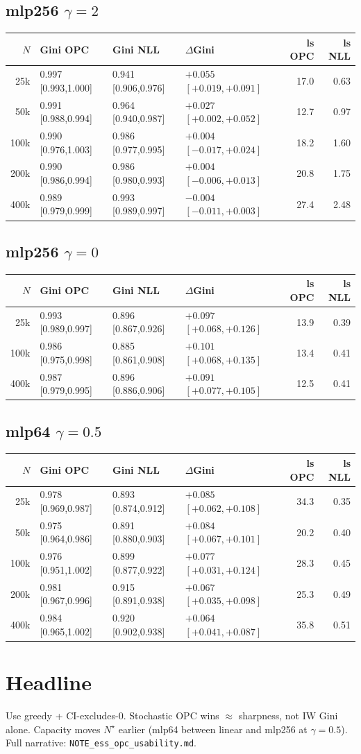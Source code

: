 \documentclass[10pt]{article}
\begin{document}
\subsection*{mlp256 $\gamma{=}2$}
{\scriptsize
\begin{tabular}{@{}r ll l rr@{}}
\toprule
$N$ & Gini OPC & Gini NLL & $\Delta$Gini & ls OPC & ls NLL \\
\midrule
25k & 0.997 [0.993,1.000] & 0.941 [0.906,0.976] & $+0.055$ $[+0.019,+0.091]$ & 17.0 & 0.63 \\
50k & 0.991 [0.988,0.994] & 0.964 [0.940,0.987] & $+0.027$ $[+0.002,+0.052]$ & 12.7 & 0.97 \\
100k & 0.990 [0.976,1.003] & 0.986 [0.977,0.995] & $+0.004$ $[-0.017,+0.024]$ & 18.2 & 1.60 \\
200k & 0.990 [0.986,0.994] & 0.986 [0.980,0.993] & $+0.004$ $[-0.006,+0.013]$ & 20.8 & 1.75 \\
400k & 0.989 [0.979,0.999] & 0.993 [0.989,0.997] & $-0.004$ $[-0.011,+0.003]$ & 27.4 & 2.48 \\
\bottomrule
\end{tabular}}

\subsection*{mlp256 $\gamma{=}0$}
{\scriptsize
\begin{tabular}{@{}r ll l rr@{}}
\toprule
$N$ & Gini OPC & Gini NLL & $\Delta$Gini & ls OPC & ls NLL \\
\midrule
25k & 0.993 [0.989,0.997] & 0.896 [0.867,0.926] & $+0.097$ $[+0.068,+0.126]$ & 13.9 & 0.39 \\
100k & 0.986 [0.975,0.998] & 0.885 [0.861,0.908] & $+0.101$ $[+0.068,+0.135]$ & 13.4 & 0.41 \\
400k & 0.987 [0.979,0.995] & 0.896 [0.886,0.906] & $+0.091$ $[+0.077,+0.105]$ & 12.5 & 0.41 \\
\bottomrule
\end{tabular}}

\subsection*{mlp64 $\gamma{=}0.5$}
{\scriptsize
\begin{tabular}{@{}r ll l rr@{}}
\toprule
$N$ & Gini OPC & Gini NLL & $\Delta$Gini & ls OPC & ls NLL \\
\midrule
25k & 0.978 [0.969,0.987] & 0.893 [0.874,0.912] & $+0.085$ $[+0.062,+0.108]$ & 34.3 & 0.35 \\
50k & 0.975 [0.964,0.986] & 0.891 [0.880,0.903] & $+0.084$ $[+0.067,+0.101]$ & 20.2 & 0.40 \\
100k & 0.976 [0.951,1.002] & 0.899 [0.877,0.922] & $+0.077$ $[+0.031,+0.124]$ & 28.3 & 0.45 \\
200k & 0.981 [0.967,0.996] & 0.915 [0.891,0.938] & $+0.067$ $[+0.035,+0.098]$ & 25.3 & 0.49 \\
400k & 0.984 [0.965,1.002] & 0.920 [0.902,0.938] & $+0.064$ $[+0.041,+0.087]$ & 35.8 & 0.51 \\
\bottomrule
\end{tabular}}

\section*{Headline}
Use greedy + CI-excludes-0. Stochastic OPC wins $\approx$ sharpness, not IW Gini alone.
Capacity moves $N^\star$ earlier (mlp64 between linear and mlp256 at $\gamma{=}0.5$).
Full narrative: \texttt{NOTE\_ess\_opc\_usability.md}.
\end{document}
